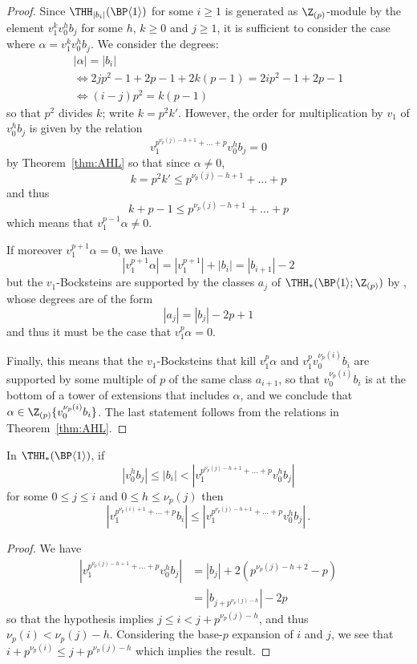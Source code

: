 \begin{proof}
  Since $\THH_{|b_i|}(\BP\langle 1\rangle)$ for some $i\ge 1$ is generated as $\Z_{(p)}$-module by the element $v_1^k v_0^h b_j$ for some $h,\, k \geq 0$ and $j \geq 1$, it is sufficient to consider the case where $\alpha = v_1^k v_0^h b_j$. We consider the degrees:
  \[
    \begin{gathered}
      |\alpha| = |b_i| \\
      \iff 2j p^2 - 1 + 2p - 1 + 2k(p-1) = 2i p^2 - 1 + 2p - 1 \\
      \iff (i - j)p^2 = k(p -1)
    \end{gathered}
  \]
  so that $p^2$ divides $k$; write $k = p^2 k'$. However, the order for multiplication by $v_1$ of $v_0^h b_j$ is given by the relation
  \[
    v_1^{p^{\nu_p(j) - h + 1}+ \dots + p} v_0^h b_j = 0
  \]
  by Theorem~\ref{thm:AHL} so that since $\alpha \neq 0$,
  \[
    k = p^2 k' \leq p^{\nu_p(j) - h + 1}+ \dots + p
  \]
  and thus
  \[
    k + p - 1 \leq p^{\nu_p(j) - h + 1}+ \dots + p
  \]
  which means that $v_1^{p - 1} \alpha \neq 0$.

  If moreover $v_1^{p+1} \alpha = 0$, we have 
  \[
    |v_1^{p+1} \alpha| = |v_1^{p+1}| + |b_i| = |b_{i+1}| - 2
  \]
  but the $v_1$-Bocksteins are supported by the classes $a_j$ of $\THH_*(\BP\langle 1\rangle; \Z_{(p)})$ by \cite[Theorem~6.4]{AHL10}, whose degrees are of the form
  \[
    |a_j| = |b_j| - 2p + 1
  \]
  and thus it must be the case that $v_1^p \alpha = 0$.
  
  Finally, this means that the $v_1$-Bocksteins that kill $v_1^p \alpha$ and $v_1^p v_0^{\nu_p(i)} b_i$ are supported by some multiple of $p$ of the same class $a_{i + 1}$, so that $v_0^{\nu_p(i)} b_i$ is at the bottom of a tower of extensions that includes $\alpha$, and we conclude that  $\alpha \in \Z_{(p)}\{ v_0^{\nu_p(i)} b_i \}$. The last statement follows from the relations in Theorem~\ref{thm:AHL}. 
\end{proof}

\begin{lemma} \label{lem:thhell2}
  In $\THH_*(\BP\langle 1\rangle)$, if
  \[
    |v_0^hb_j| \leq | b_i| < | v_1^{p^{\nu_p(j) - h + 1} + \dots + p} v_0^hb_j |
  \]
  for some $ 0 \leq j \leq i$ and $0 \leq h \leq \nu_p(j)$ then
  \[
    | v_1^{p^{\nu_p(i) + 1} + \dots + p} b_i | \leq | v_1^{p^{\nu_p(j) - h + 1} + \dots + p} v_0^hb_j | \,.
  \]
\end{lemma}

\begin{proof}
  We have
  \[
    \begin{aligned}
      | v_1^{p^{\nu_p(j) - h + 1} + \dots + p} v_0^hb_j |
      & = |b_j| + 2(p^{\nu_p(j) - h + 2} - p) \\
      & = |b_{j + p^{\nu_p(j) - h}} | - 2p
    \end{aligned}
  \]
  so that the hypothesis implies $j \leq i < j + p^{\nu_p(j) - h}$, and thus $\nu_p(i) < \nu_p(j) - h$. Considering the base-$p$ expansion of $i$ and $j$, we see that $ i + p^{\nu_p(i)} \leq j + p^{\nu_p(j) - h}$ which implies the result.
\end{proof}

